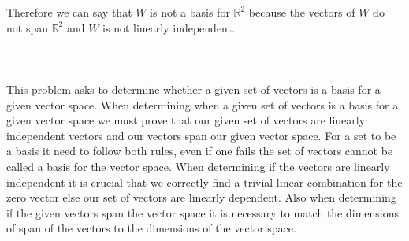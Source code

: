 \documentclass[12pt]{article}
\begin{document}
Therefore we can say that $W$ is not a basis for $\mathbb{R}^2$ because the vectors of $W$ do not span $\mathbb{R}^2$ and $W$ is not linearly independent.
\\\\ \\\\
This problem asks to determine whether a given set of vectors is a basis for a given vector space. When determining when a given set of vectors is a basis for a given vector space we must prove that our given set of vectors are linearly independent vectors and our vectors span our given vector space. For a set to be a basis it need to follow both rules, even if one fails the set of vectors cannot be called a basis for the vector space. When determining if the vectors are linearly independent it is crucial that we correctly find a trivial linear combination for the zero vector else our set of vectors are linearly dependent. Also when determining if the given vectors span the vector space it is necessary to match the dimensions of span of the vectors to the dimensions of the vector space.
\newpage
\end{document}
